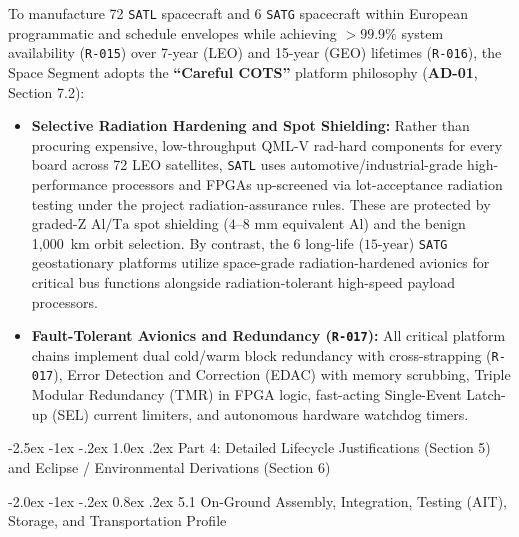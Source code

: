 \documentclass[11pt,a4paper]{article}
\makeatletter
\renewcommand\subsection{\@startsection{subsection}{2}{\z@}%
    {-2.5ex \@plus -1ex \@minus -.2ex}%
    {1.0ex \@plus .2ex}%
    {\normalfont\large\bfseries\sffamily\color{SubHeadingBlue}}}
\renewcommand\subsubsection{\@startsection{subsubsection}{3}{\z@}%
    {-2.0ex \@plus -1ex \@minus -.2ex}%
    {0.8ex \@plus .2ex}%
    {\normalfont\normalsize\bfseries\sffamily\color{SubHeadingBlue}}}
\providecommand{\abbr}[1]{#1}
\makeatother
\begin{document}
To manufacture 72 \texttt{SATL} spacecraft and 6 \texttt{SATG} spacecraft within European programmatic and schedule envelopes while achieving $> 99.9\%$ system availability (\texttt{R-015}) over 7-year (\abbr{LEO}) and 15-year (\abbr{GEO}) lifetimes (\texttt{R-016}), the Space Segment adopts the \textbf{``Careful \abbr{COTS}''} platform philosophy (\textbf{AD-01}, Section 7.2):
\begin{itemize}
    \item \textbf{Selective Radiation Hardening and Spot Shielding:} Rather than procuring expensive, low-throughput QML-V rad-hard components for every board across 72 \abbr{LEO} satellites, \texttt{SATL} uses automotive/industrial-grade high-performance processors and FPGAs up-screened via lot-acceptance radiation testing under the project radiation-assurance rules. These are protected by graded-Z $\mathrm{Al}/\mathrm{Ta}$ spot shielding ($4\text{--}8\text{ mm}$ equivalent $\mathrm{Al}$) and the benign 1,000~km orbit selection. By contrast, the 6 long-life ($15\text{-year}$) \texttt{SATG} geostationary platforms utilize space-grade radiation-hardened avionics for critical bus functions alongside radiation-tolerant high-speed payload processors.
    \item \textbf{Fault-Tolerant Avionics and Redundancy (\texttt{R-017}):} All critical platform chains implement dual cold/warm block redundancy with cross-strapping (\texttt{R-017}), Error Detection and Correction (\abbr{EDAC}) with memory scrubbing, Triple Modular Redundancy (\abbr{TMR}) in FPGA logic, fast-acting Single-Event Latch-up (\abbr{SEL}) current limiters, and autonomous hardware watchdog timers.
\end{itemize}

\subsection{Part 4: Detailed Lifecycle Justifications (Section 5) and Eclipse / Environmental Derivations (Section 6)}

\subsubsection{5.1 On-Ground Assembly, Integration, Testing (AIT), Storage, and Transportation Profile}
\end{document}
